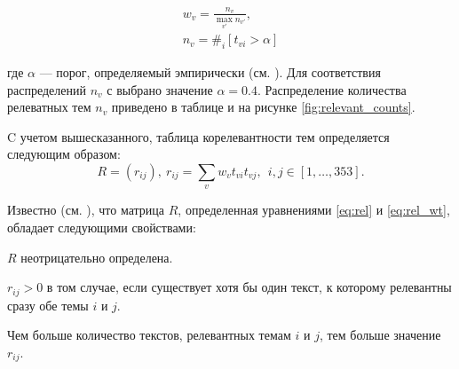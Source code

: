\documentclass[12pt]{article}
\newenvironment{itemize*}%
{\begin{itemize}%
		\setlength{\itemsep}{0pt}%
		\setlength{\parskip}{0pt}}%
	{\end{itemize}}
\begin{document}
\begin{equation}
	\begin{gathered}
		w_{v} = \frac{n_v}{\max_{v'} n_{v'}}, \\
		n_v = \#_i[t_{vi} > \alpha]
	\end{gathered}
	\label{eq:rel_wt}
\end{equation}

где $\alpha$ --- порог, определяемый эмпирически (см. \cite{Chernyak_2015}). Для соответствия распределений $n_v$ с \cite{mirkin2018preprint} выбрано значение $\alpha=0.4$. Распределение количества релеватных тем $n_v$ приведено в таблице и на рисунке \ref{fig:relevant_counts}.

C учетом вышесказанного, таблица корелевантности тем определяется следующим образом:
\begin{equation}
	R = (r_{ij}), \  r_{ij} = \sum_{v} w_{v} t_{vi} t_{vj}, \ \ i,j\in[1,\ldots, 353].
	\label{eq:rel}
\end{equation}

Известно (см. \cite{MirkinChernyak2012}), что матрица $R$, определенная уравнениями \eqref{eq:rel} и \eqref{eq:rel_wt}, обладает следующими свойствами:

\begin{itemize*}
	\item $R$ неотрицательно определена.
	\item $r_{ij}>0$ в том случае, если существует хотя бы один текст, к которому релевантны сразу обе темы $i$ и $j$.
	\item Чем больше количество текстов, релевантных темам $i$ и $j$, тем больше значение $r_{ij}$.
\end{itemize*}
\end{document}
